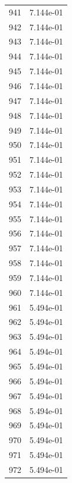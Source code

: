 \documentclass[12pt]{article}
\begin{document}
\begin{longtable}{@{}cc@{}}
941 & 7.144e-01 \\
942 & 7.144e-01 \\
943 & 7.144e-01 \\
944 & 7.144e-01 \\
945 & 7.144e-01 \\
946 & 7.144e-01 \\
947 & 7.144e-01 \\
948 & 7.144e-01 \\
949 & 7.144e-01 \\
950 & 7.144e-01 \\
951 & 7.144e-01 \\
952 & 7.144e-01 \\
953 & 7.144e-01 \\
954 & 7.144e-01 \\
955 & 7.144e-01 \\
956 & 7.144e-01 \\
957 & 7.144e-01 \\
958 & 7.144e-01 \\
959 & 7.144e-01 \\
960 & 7.144e-01 \\
961 & 5.494e-01 \\
962 & 5.494e-01 \\
963 & 5.494e-01 \\
964 & 5.494e-01 \\
965 & 5.494e-01 \\
966 & 5.494e-01 \\
967 & 5.494e-01 \\
968 & 5.494e-01 \\
969 & 5.494e-01 \\
970 & 5.494e-01 \\
971 & 5.494e-01 \\
972 & 5.494e-01 \\

\bottomrule
\end{longtable}
\end{document}
